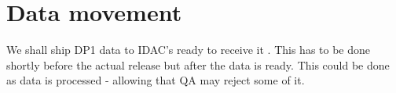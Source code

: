 \section{Data movement} \label{sec:data}

 We shall ship DP1 data to IDAC's ready to receive it .
This has to be done shortly before the actual release but after the data is ready.
This could be done as data is processed - allowing that QA may reject some of it.

